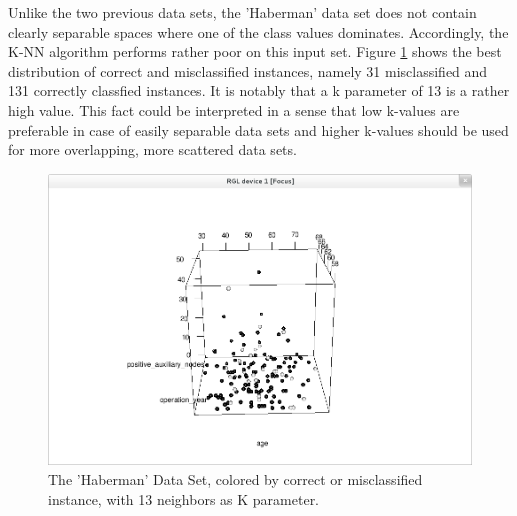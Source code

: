 \documentclass[paper=a4, fontsize=11pt]{scrartcl} %
\numberwithin{equation}{section} %
\numberwithin{figure}{section} %
\numberwithin{table}{section} %
\begin{document}
Unlike the two previous data sets, the 'Haberman' data set does not contain clearly separable spaces where one of the class values dominates. Accordingly, the K-NN algorithm performs rather poor on this input set. Figure \ref{fig:haberman:correct:k13} shows the best distribution of correct and misclassified instances, namely 31 misclassified and 131 correctly classfied instances. It is notably that a k parameter of 13 is a rather high value. This fact could be interpreted in a sense that low k-values are preferable in case of easily separable data sets and higher k-values should be used for more overlapping, more scattered data sets.
\begin{figure}[\textwidth]
    \begin{center}
\includegraphics[width=\textwidth]{Haberman_correct_k13}
    \end{center}
\caption['Haberman' correctness with k=13]{The 'Haberman' Data Set, colored by correct or misclassified instance, with 13 neighbors as K parameter.}
\label{fig:haberman:correct:k13}
\end{figure}
\end{document}
